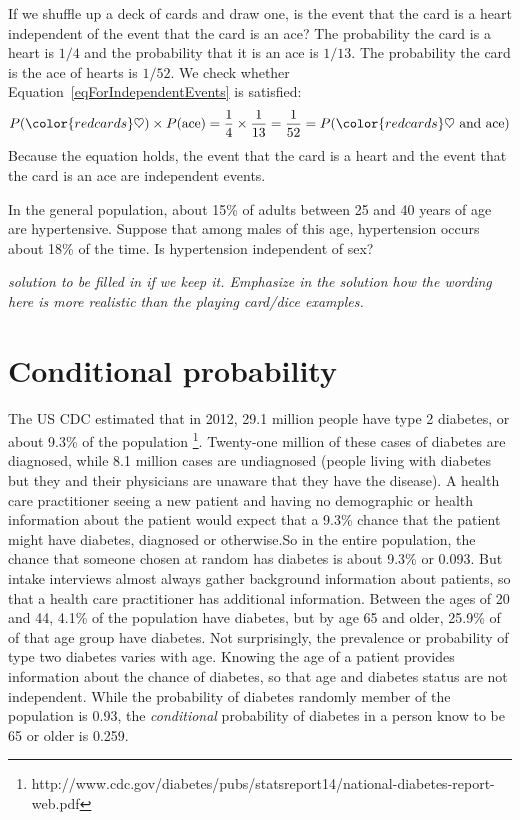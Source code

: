 \begin{example}{If we shuffle up a deck of cards and draw one, is the event that the card is a heart independent of the event that the card is an ace?}
The probability the card is a heart is $1/4$ and the probability that it is an ace is $1/13$. The probability the card is the ace of hearts is $1/52$. We check whether Equation~\ref{eqForIndependentEvents} is satisfied:
\begin{align*}
P({\color{redcards}\heartsuit})\times P(\text{ace}) = \frac{1}{4}\times \frac{1}{13} = \frac{1}{52} 
					= P({\color{redcards}\heartsuit}\text{ and ace})
\end{align*}
Because the equation holds, the event that the card is a heart and the event that the card is an ace are independent events.
\end{example}

\begin{example}
 In the general population, about 15\% of adults between 25 and 40  years of age are hypertensive.  Suppose that among males of this age, hypertension occurs about 18\% of the time.  Is hypertension independent of sex? 

 \textit{solution to be filled in if we keep it.  Emphasize in the solution how the wording here is more realistic than the playing card/dice examples.}
\end{example}





\section{Conditional probability}
\label{conditionalProbabilitySection}

The US CDC estimated that in 2012, 29.1 million people have type 2 diabetes, or about 9.3\% of the population \footnote{http://www.cdc.gov/diabetes/pubs/statsreport14/national-diabetes-report-web.pdf}. Twenty-one million of these cases of diabetes are diagnosed, while 8.1 million cases are undiagnosed (people living  with diabetes but they and their physicians are unaware that they have the disease).   A health care practitioner seeing a new patient and having no demographic or health information about the patient would expect that a 9.3\% chance that the  patient might have diabetes, diagnosed or otherwise.So in the entire population, the chance that someone chosen at random has diabetes is about 9.3\% or 0.093.  But intake interviews almost always gather background information about patients, so that a health care practitioner has additional information.  Between the ages of 20 and 44, 4.1\% of the population have diabetes, but by age 65 and older, 25.9\% of of that age group have diabetes.  Not surprisingly, the prevalence or probability of type two diabetes varies with age.  Knowing the age of a patient provides information about the chance of diabetes, so that age and diabetes status are not independent. While the probability of diabetes randomly member of the population is 0.93, the \textit{conditional} probability of diabetes in a person know to be 65 or older is 0.259. 

